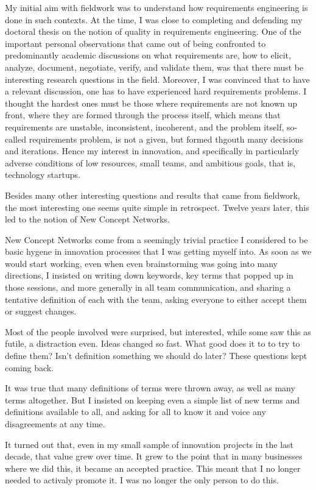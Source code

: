 \documentclass[graybox,envcountchap,sectrefs]{svmono}
\newcommand{\ncnf}{New Concept Network}
\begin{document}
My initial aim with fieldwork was to understand how requirements engineering is done in such contexts. At the time, I was close to completing and defending my doctoral thesis on the notion of quality in requirements engineering. One of the important personal observations that came out of being confronted to predominantly academic discussions on what requirements are, how to elicit, analyze, document, negotiate, verify, and validate them, was that there must be interesting research questions in the field. Moreover, I was convinced that to have a relevant discussion, one has to have experienced hard requirements problems. I thought the hardest ones must be those where requirements are not known up front, where they are formed through the process itself, which means that requirements are unstable, inconsistent, incoherent, and the problem itself, so-called requirements problem, is not a given, but formed thgouth many decisions and iterations. Hence my interest in innovation, and specifically in particularly adverse conditions of low resources, small teams, and ambitious goals, that is, technology startups.

Besides many other interesting questions and results that came from fieldwork, the most interesting one seems quite simple in retrospect. Twelve years later, this led to the notion of \ncnf s. 

\ncnf s come from a seemingly trivial practice I considered to be basic hygene in innovation processes that I was getting myself into. As soon as we would start working, even when even brainstorming was going into many directions, I insisted on writing down keywords, key terms that popped up in those sessions, and more generally in all team communication, and sharing a tentative definition of each with the team, asking everyone to either accept them or suggest changes. 

Most of the people involved were surprised, but interested, while some saw this as futile, a distraction even. Ideas changed so fast. What good does it to to try to define them? Isn't definition something we should do later? These questions kept coming back.

It was true that many definitions of terms were thrown away, as well as many terms altogether. But I insisted on keeping even a simple list of new terms and definitions available to all, and asking for all to know it and voice any disagreements at any time.

It turned out that, even in my small sample of innovation projects in the last decade, that value grew over time. It grew to the point that in many businesses where we did this, it became an accepted practice. This meant that I no longer needed to activaly promote it. I was no longer the only person to do this. 
\end{document}

